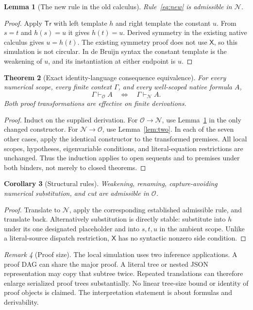 \documentclass[11pt,letterpaper]{article}
\newtheorem{theorem}{Theorem}[section]
\newtheorem{lemma}[theorem]{Lemma}
\newtheorem{corollary}[theorem]{Corollary}
\theoremstyle{definition}\newtheorem{definition}[theorem]{Definition}
\theoremstyle{remark}\newtheorem{remark}[theorem]{Remark}
\newcommand{\N}{\mathcal N}
\newcommand{\Ocal}{\mathcal O}
\newcommand{\One}{\mathsf X}
\newcommand{\Tr}{\mathsf{Tr}}
\begin{document}
\begin{lemma}[The new rule in the old calculus]
\label{lem:one}
Rule~\eqref{eq:new} is admissible in \(\N\).
\end{lemma}
\begin{proof}
Apply \(\Tr\) with left template \(h\) and right template the constant
\(u\). From \(s=t\) and \(h(s)=u\) it gives \(h(t)=u\).
Derived symmetry in the existing native calculus gives \(u=h(t)\).
The existing symmetry proof does not use \(\One\), so this simulation
is not circular. In de Bruijn syntax the constant template is the
weakening of \(u\), and its instantiation at either endpoint is \(u\).
\end{proof}

\begin{theorem}[Exact identity-language consequence equivalence]
\label{thm:exact}
For every numerical scope, every finite context \(\Gamma\), and every
well-scoped native formula \(A\),
\[
                  \Gamma\vdash_{\Ocal} A
             \quad\Longleftrightarrow\quad
                  \Gamma\vdash_{\N} A.
 \tag{12}
\]
Both proof transformations are effective on finite derivations.
\end{theorem}
\begin{proof}
Induct on the supplied derivation. For \(\Ocal\to\N\), use
Lemma~\ref{lem:one} in the only changed constructor. For
\(\N\to\Ocal\), use Lemma~\ref{lem:two}. In each of the seven other
cases, apply the identical constructor to the transformed premises.
All local scopes, hypotheses, eigenvariable conditions, and literal-equation
restrictions are unchanged. Thus the induction applies to open sequents
and to premises under both binders, not merely to closed theorems.
\end{proof}

\begin{corollary}[Structural rules]
Weakening, renaming, capture-avoiding numerical substitution, and cut are
admissible in \(\Ocal\).
\end{corollary}
\begin{proof}
Translate to \(\N\), apply the corresponding established admissible
rule, and translate back. Alternatively substitution is directly stable:
substitute into \(h\) under its one designated placeholder and into
\(s,t,u\) in the ambient scope. Unlike a literal-source dispatch
restriction, \(\One\) has no syntactic nonzero side condition.
\end{proof}

\begin{remark}[Proof size]
The local simulation uses two inference applications. A proof DAG can
share the major proof. A literal tree or nested JSON representation may
copy that subtree twice. Repeated translations can therefore enlarge
serialized proof trees substantially. No linear tree-size bound or
identity of proof objects is claimed. The interpretation statement is
about formulas and derivability.
\end{remark}
\end{document}
